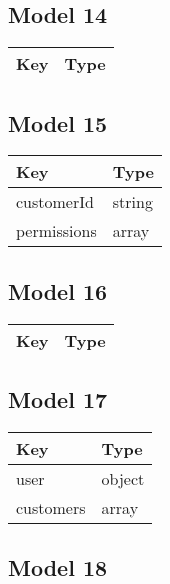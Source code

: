 \documentclass[10pt]{article}
\begin{document}
            \subsection{Model 14}
            
            \begin{tabularx}{\textwidth}{lZ}
                \textbf{Key} & \textbf{Type} \\
                \hline
            \end{tabularx}
            \subsection{Model 15}
            
            \begin{tabularx}{\textwidth}{lZ}
                \textbf{Key} & \textbf{Type} \\
                \hline
                    customerId & string \\
                    permissions & array \\
            \end{tabularx}
            \subsection{Model 16}
            
            \begin{tabularx}{\textwidth}{lZ}
                \textbf{Key} & \textbf{Type} \\
                \hline
            \end{tabularx}
            \subsection{Model 17}
            
            \begin{tabularx}{\textwidth}{lZ}
                \textbf{Key} & \textbf{Type} \\
                \hline
                    user & object \\
                    customers & array \\
            \end{tabularx}
            \subsection{Model 18}
            
\end{document}
